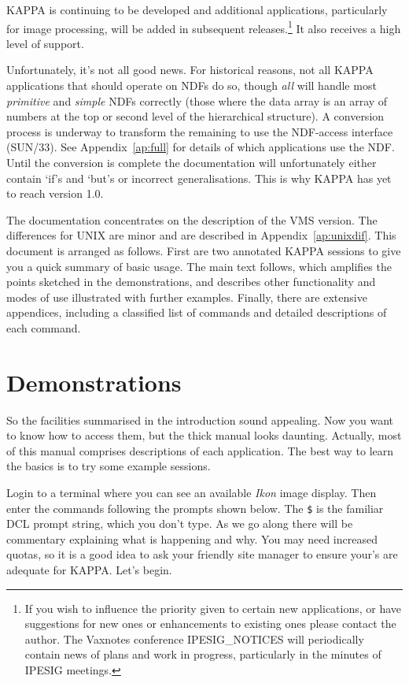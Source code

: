 {\small KAPPA} is continuing to be developed and additional
applications, particularly for image processing, will be added in
subsequent releases.\footnote{If you wish to influence the priority
given to certain new applications, or have suggestions for new ones or
enhancements to existing ones please contact the author.  The Vaxnotes
conference IPESIG\_NOTICES will periodically contain news of plans and
work in progress, particularly in the minutes of IPESIG meetings.} It
also receives a high level of support. 

Unfortunately, it's not all good news.  For historical reasons, not all
{\small KAPPA} applications that should operate on NDFs do so, though
{\em all\/} will handle most {\em primitive\/} and {\em simple\/} NDFs
correctly (those where the data array is an array of numbers at the top
or second level of the hierarchical structure). A conversion process is underway
to transform the remaining to use the NDF-access interface (SUN/33). See
Appendix~\ref{ap:full} for details of which applications use the NDF.
Until the conversion is complete the documentation will unfortunately
either contain `if's and `but's or incorrect generalisations.  This is
why {\small KAPPA} has yet to reach version 1.0.

The documentation concentrates on the description of the {\small VMS}
version.  The differences for {\small UNIX} are minor and are described
in Appendix~\ref{ap:unixdif}.  This document is arranged as follows. 
First are two annotated {\small KAPPA} sessions to give you a quick
summary of basic usage.  The main text follows, which amplifies the
points sketched in the demonstrations, and describes other functionality
and modes of use illustrated with further examples.  Finally, there are
extensive appendices, including a classified list of commands and
detailed descriptions of each command. 

\section{Demonstrations}
\label{se:demo}
So the facilities summarised in the introduction sound appealing.  Now
you want to know how to access them, but the thick manual looks
daunting. Actually, most of this manual comprises descriptions of each
application. The best way to learn the basics is to try some example
sessions.

Login to a terminal where you can see an available {\em Ikon\/} image
display. Then enter the commands following the prompts shown below. The
{\tt \$} is the familiar {\small DCL} prompt string, which you don't
type. As we go along there will be commentary explaining what is
happening and why. You may need increased quotas, so it is a good idea
to ask your friendly site manager to ensure your's are adequate for
{\small KAPPA}.  Let's begin. 

